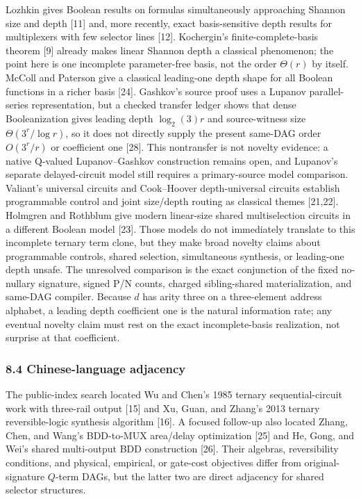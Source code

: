 \documentclass[
  11pt,
]{article}
\theoremstyle{definition}
\theoremstyle{remark}
\begin{document}
Lozhkin gives Boolean results on formulas simultaneously approaching
Shannon size and depth {[}11{]} and, more recently, exact
basis-sensitive depth results for multiplexers with few selector lines
{[}12{]}. Kochergin's finite-complete-basis theorem {[}9{]} already
makes linear Shannon depth a classical phenomenon; the point here is one
incomplete parameter-free basis, not the order \(\Theta(r)\) by itself.
McColl and Paterson give a classical leading-one depth shape for all
Boolean functions in a richer basis {[}24{]}. Gashkov's source proof
uses a Lupanov parallel-series representation, but a checked transfer
ledger shows that dense Booleanization gives leading depth
\(\log_2(3)r\) and source-witness size \(\Theta(3^r/\log r)\), so it
does not directly supply the present same-DAG order \(O(3^r/r)\) or
coefficient one {[}28{]}. This nontransfer is not novelty evidence: a
native Q-valued Lupanov--Gashkov construction remains open, and
Lupanov's separate delayed-circuit model still requires a primary-source
model comparison. Valiant's universal circuits and Cook--Hoover
depth-universal circuits establish programmable control and joint
size/depth routing as classical themes {[}21,22{]}. Holmgren and
Rothblum give modern linear-size shared multiselection circuits in a
different Boolean model {[}23{]}. Those models do not immediately
translate to this incomplete ternary term clone, but they make broad
novelty claims about programmable controls, shared selection,
simultaneous synthesis, or leading-one depth unsafe. The unresolved
comparison is the exact conjunction of the fixed no-nullary signature,
signed P/N counts, charged sibling-shared materialization, and same-DAG
compiler. Because \(d\) has arity three on a three-element address
alphabet, a leading depth coefficient one is the natural information
rate; any eventual novelty claim must rest on the exact incomplete-basis
realization, not surprise at that coefficient.

\hypertarget{chinese-language-adjacency}{%
\subsubsection{8.4 Chinese-language
adjacency}\label{chinese-language-adjacency}}

The public-index search located Wu and Chen's 1985 ternary
sequential-circuit work with three-rail output {[}15{]} and Xu, Guan,
and Zhang's 2013 ternary reversible-logic synthesis algorithm {[}16{]}.
A focused follow-up also located Zhang, Chen, and Wang's BDD-to-MUX
area/delay optimization {[}25{]} and He, Gong, and Wei's shared
multi-output BDD construction {[}26{]}. Their algebras, reversibility
conditions, and physical, empirical, or gate-cost objectives differ from
original-signature \(Q\)-term DAGs, but the latter two are direct
adjacency for shared selector structures.
\end{document}
